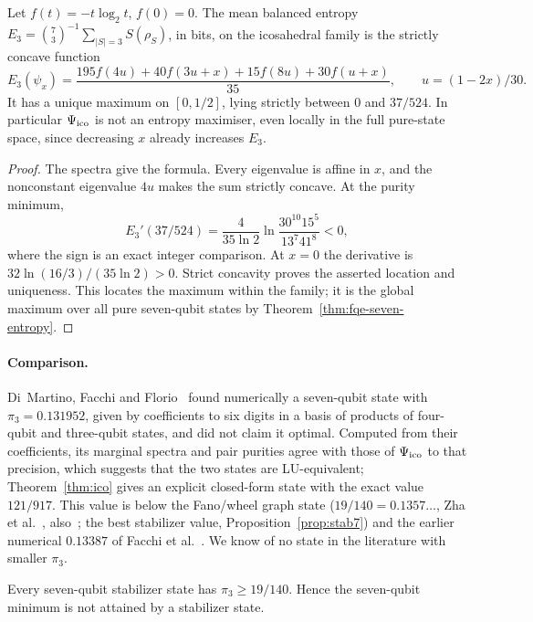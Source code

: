 \begin{corollary}
\label{cor:ico-entropy-separation}
Let $f(t)=-t\log_2t$, $f(0)=0$. The mean balanced entropy $E_3=\binom73^{-1}\sum_{|S|=3}S(\rho_S)$, in bits, on the
icosahedral family is the strictly concave function
\[
 E_3(\psi_x)=\frac{195f(4u)+40f(3u+x)+15f(8u)+30f(u+x)}{35},
 \qquad u=(1-2x)/30.
\]
It has a unique maximum on $[0,1/2]$, lying strictly between $0$ and
$37/524$. In particular $\Psi_{\mathrm{ico}}$ is not an entropy maximiser, even
locally in the full pure-state space, since decreasing $x$ already increases $E_3$.
\end{corollary}
\noindent[Check IC-6.]
\begin{proof}
The spectra give the formula. Every eigenvalue is affine in $x$,
and the nonconstant eigenvalue $4u$ makes the sum strictly concave.
At the purity minimum,
\[
 E_3'(37/524)=\frac4{35\ln2}
 \ln\frac{30^{10}15^5}{13^7 41^8}<0,
\]
where the sign is an exact integer comparison. At $x=0$ the
derivative is $32\ln(16/3)/(35\ln2)>0$.
Strict concavity proves the asserted location and uniqueness.
This locates the maximum within the family; it is the global
maximum over all pure seven-qubit states by
Theorem~\ref{thm:fqe-seven-entropy}.
\end{proof}


\paragraph{Comparison.} Di~Martino, Facchi and Florio~\cite{DMFF18} found numerically a seven-qubit
state with $\pi_3=0.131952$, given by coefficients to six digits in a basis of products of four-qubit and
three-qubit states, and did not claim it optimal. Computed from their coefficients, its marginal
spectra and pair purities agree with those of $\Psi_{\mathrm{ico}}$ to that precision, which suggests that the two states are
LU-equivalent; Theorem~\ref{thm:ico} gives an explicit closed-form state with the exact value
$121/917$. This value is below the Fano/wheel graph state ($19/140=0.1357\ldots$,
Zha et al.~\cite{Zha11}, also~\cite{HGS}; the best stabilizer value, Proposition~\ref{prop:stab7}) and
the earlier numerical $0.13387$ of Facchi et al.~\cite{Facchi}. We know of no state in the literature
with smaller $\pi_3$.

\begin{proposition}\label{prop:stab7}
Every seven-qubit stabilizer state has $\pi_3\ge 19/140$. Hence the seven-qubit minimum is not
attained by a stabilizer state.
\end{proposition}


